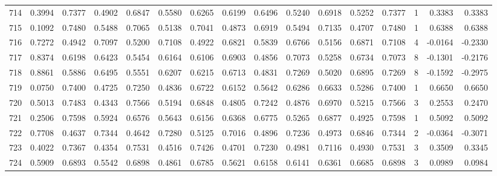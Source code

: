\begin{tabular}{lrrrrrrrrrrrrrrr}
714 &      0.3994 &  0.7377 &  0.4902 &  0.6847 &  0.5580 &  0.6265 &  0.6199 &  0.6496 &  0.5240 &  0.6918 &   0.5252 &     0.7377 &      1 &                    0.3383 &                     0.3383 \\
715 &      0.1092 &  0.7480 &  0.5488 &  0.7065 &  0.5138 &  0.7041 &  0.4873 &  0.6919 &  0.5494 &  0.7135 &   0.4707 &     0.7480 &      1 &                    0.6388 &                     0.6388 \\
716 &      0.7272 &  0.4942 &  0.7097 &  0.5200 &  0.7108 &  0.4922 &  0.6821 &  0.5839 &  0.6766 &  0.5156 &   0.6871 &     0.7108 &      4 &                   -0.0164 &                    -0.2330 \\
717 &      0.8374 &  0.6198 &  0.6423 &  0.5454 &  0.6164 &  0.6106 &  0.6903 &  0.4856 &  0.7073 &  0.5258 &   0.6734 &     0.7073 &      8 &                   -0.1301 &                    -0.2176 \\
718 &      0.8861 &  0.5886 &  0.6495 &  0.5551 &  0.6207 &  0.6215 &  0.6713 &  0.4831 &  0.7269 &  0.5020 &   0.6895 &     0.7269 &      8 &                   -0.1592 &                    -0.2975 \\
719 &      0.0750 &  0.7400 &  0.4725 &  0.7250 &  0.4836 &  0.6722 &  0.6152 &  0.5642 &  0.6286 &  0.6633 &   0.5286 &     0.7400 &      1 &                    0.6650 &                     0.6650 \\
720 &      0.5013 &  0.7483 &  0.4343 &  0.7566 &  0.5194 &  0.6848 &  0.4805 &  0.7242 &  0.4876 &  0.6970 &   0.5215 &     0.7566 &      3 &                    0.2553 &                     0.2470 \\
721 &      0.2506 &  0.7598 &  0.5924 &  0.6576 &  0.5643 &  0.6156 &  0.6368 &  0.6775 &  0.5265 &  0.6877 &   0.4925 &     0.7598 &      1 &                    0.5092 &                     0.5092 \\
722 &      0.7708 &  0.4637 &  0.7344 &  0.4642 &  0.7280 &  0.5125 &  0.7016 &  0.4896 &  0.7236 &  0.4973 &   0.6846 &     0.7344 &      2 &                   -0.0364 &                    -0.3071 \\
723 &      0.4022 &  0.7367 &  0.4354 &  0.7531 &  0.4516 &  0.7426 &  0.4701 &  0.7230 &  0.4981 &  0.7116 &   0.4930 &     0.7531 &      3 &                    0.3509 &                     0.3345 \\
724 &      0.5909 &  0.6893 &  0.5542 &  0.6898 &  0.4861 &  0.6785 &  0.5621 &  0.6158 &  0.6141 &  0.6361 &   0.6685 &     0.6898 &      3 &                    0.0989 &                     0.0984 \\

\end{tabular}
